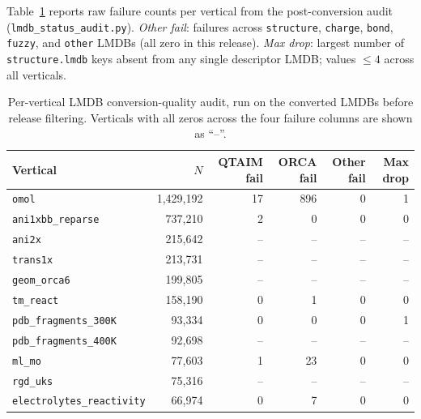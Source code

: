 Table~\ref{tab:lmdb_quality} reports raw failure counts per vertical from the
post-conversion audit (\texttt{lmdb\_status\_audit.py}).
\textit{Other fail}: failures across \texttt{structure}, \texttt{charge},
\texttt{bond}, \texttt{fuzzy}, and \texttt{other} LMDBs (all zero in this
release).
\textit{Max drop}: largest number of \texttt{structure.lmdb} keys absent from
any single descriptor LMDB; values $\leq 4$ across all verticals.

\begin{table}[h]
\centering
\caption{Per-vertical LMDB conversion-quality audit, run on the converted LMDBs
before release filtering. Verticals with all
zeros across the four failure columns are shown as ``--''.
}
\label{tab:lmdb_quality}
\begin{tabular}{lrrrrr}
\toprule
Vertical & $N$ & QTAIM fail & ORCA fail & Other fail & Max drop \\
\midrule
  \texttt{omol} & 1,429,192 & 17 & 896 & 0 & 1 \\
  \texttt{ani1xbb\_reparse} & 737,210 & 2 & 0 & 0 & 0 \\
  \texttt{ani2x} & 215,642 & -- & -- & -- & -- \\
  \texttt{trans1x} & 213,731 & -- & -- & -- & -- \\
  \texttt{geom\_orca6} & 199,805 & -- & -- & -- & -- \\
  \texttt{tm\_react} & 158,190 & 0 & 1 & 0 & 0 \\
  \texttt{pdb\_fragments\_300K} & 93,334 & 0 & 0 & 0 & 1 \\
  \texttt{pdb\_fragments\_400K} & 92,698 & -- & -- & -- & -- \\
  \texttt{ml\_mo} & 77,603 & 1 & 23 & 0 & 0 \\
  \texttt{rgd\_uks} & 75,316 & -- & -- & -- & -- \\
  \texttt{electrolytes\_reactivity} & 66,974 & 0 & 7 & 0 & 0 \\

\end{tabular}
\end{table}

